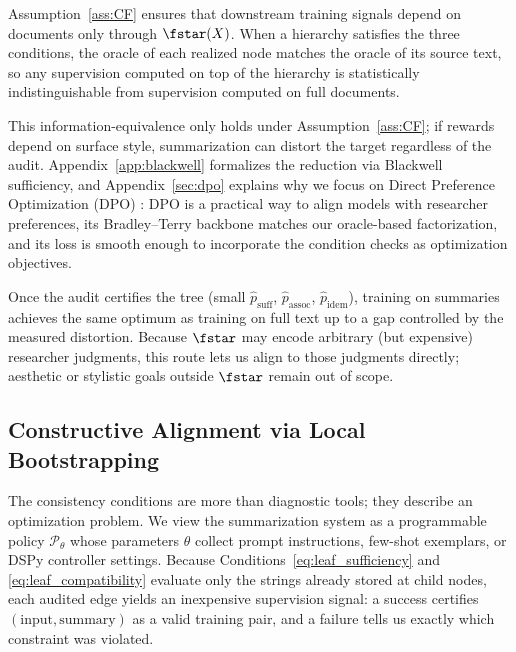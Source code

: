 Assumption~\ref{ass:CF} ensures that downstream training signals depend on documents only through $\fstar(X)$. When a hierarchy satisfies the three conditions, the oracle of each realized node matches the oracle of its source text, so any supervision computed on top of the hierarchy is statistically indistinguishable from supervision computed on full documents.

This information-equivalence only holds under Assumption~\ref{ass:CF}; if rewards depend on surface style, summarization can distort the target regardless of the audit. Appendix~\ref{app:blackwell} formalizes the reduction via Blackwell sufficiency, and Appendix~\ref{sec:dpo} explains why we focus on Direct Preference Optimization (DPO) \citep{RafailovEtAl2023DPO}: DPO is a practical way to align models with researcher preferences, its Bradley--Terry backbone matches our oracle-based factorization, and its loss is smooth enough to incorporate the condition checks as optimization objectives.

Once the audit certifies the tree (small $\hat{p}_{\text{suff}}$, $\hat{p}_{\text{assoc}}$, $\hat{p}_{\text{idem}}$), training on summaries achieves the same optimum as training on full text up to a gap controlled by the measured distortion. Because $\fstar$ may encode arbitrary (but expensive) researcher judgments, this route lets us align to those judgments directly; aesthetic or stylistic goals outside $\fstar$ remain out of scope.

\subsection{Constructive Alignment via Local Bootstrapping}\label{sec:bootstrap-main}

The consistency conditions are more than diagnostic tools; they describe an optimization problem. We view the summarization system as a programmable policy $\mathcal{P}_\theta$ whose parameters $\theta$ collect prompt instructions, few-shot exemplars, or DSPy controller settings. Because Conditions~\eqref{eq:leaf_sufficiency} and \eqref{eq:leaf_compatibility} evaluate only the strings already stored at child nodes, each audited edge yields an inexpensive supervision signal: a success certifies $(\text{input}, \text{summary})$ as a valid training pair, and a failure tells us exactly which constraint was violated.

